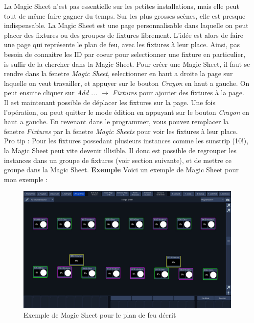 La Magic Sheet n'est pas essentielle sur les petites installations, mais elle peut tout de même faire gagner du temps.
Sur les plus grosses scènes, elle est presque indispensable.
\newline
La Magic Sheet est une page personnalisable dans laquelle on peut placer des fixtures ou des groupes de fixtures librement.
\newline
L'idée est alors de faire une page qui représente le plan de feu, avec les fixtures à leur place.
Ainsi, pas besoin de connaitre les ID par coeur pour selectionner une fixture en particulier, is suffir de la chercher dans la Magic Sheet.
\newline
\newline
Pour créer une Magic Sheet, il faut se rendre dans la fenetre \textit{Magic Sheet}, selectionner en haut a droite la page sur laquelle on veut travailler,
et appuyer sur le bouton \textit{Crayon} en haut a gauche.
\newline
On peut ensuite cliquer sur \textit{Add ...} $\rightarrow$ \textit{Fixtures} pour ajouter des fixtures à la page.
\newline
Il est maintenant possible de déplacer les fixtures sur la page.
\newline
\newline
Une fois l'opération, on peut quitter le mode édition en appuyant sur le bouton \textit{Crayon} en haut a gauche.
\newline
En revenant dans le programmer, vous pouvez remplacer la fenetre \textit{Fixtures} par la fenetre \textit{Magic Sheets} pour voir les fixtures à leur place.
\newline
\newline
Pro tip : Pour les fixtures possedant plusieurs instances comme les sunstrip (10!), la Magic Sheet peut vite devenir illisible.
Il donc est possible de regrouper les instances dans un groupe de fixtures (voir section suivante), et de mettre ce groupe dans la Magic Sheet.
\newline
\newline
\textbf{Exemple}
\newline
\newline
Voici un exemple de Magic Sheet pour mon exemple :
\begin{figure}[H]
    \centering
    \includegraphics[width=\textwidth]{3 - Encoder la Chimp/Images/magic_sheet.jpg}
    \caption{Exemple de Magic Sheet pour le plan de feu décrit}
    \label{fig:exemple_magic_sheet}
\end{figure}

